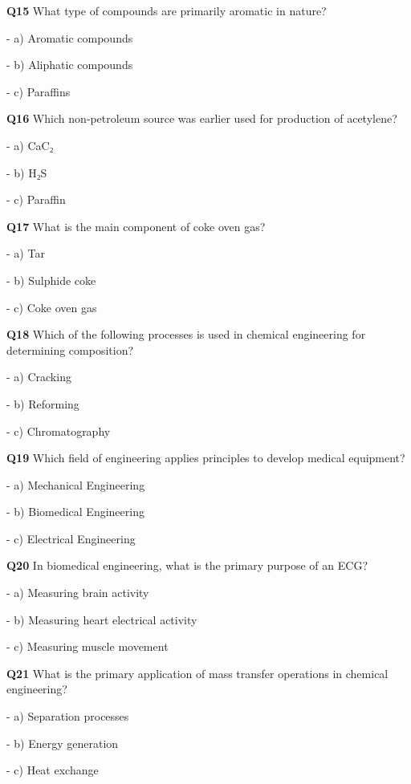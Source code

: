\textbf{Q15} What type of compounds are primarily aromatic in nature?\par
\quad - a) Aromatic compounds\par
\quad - b) Aliphatic compounds\par
\quad - c) Paraffins\par

\textbf{Q16} Which non‑petroleum source was earlier used for production of acetylene?\par
\quad - a) CaC₂\par
\quad - b) H₂S\par
\quad - c) Paraffin\par

\textbf{Q17} What is the main component of coke oven gas?\par
\quad - a) Tar\par
\quad - b) Sulphide coke\par
\quad - c) Coke oven gas\par

\textbf{Q18} Which of the following processes is used in chemical engineering for determining composition?\par
\quad - a) Cracking\par
\quad - b) Reforming\par
\quad - c) Chromatography\par

\textbf{Q19} Which field of engineering applies principles to develop medical equipment?\par
\quad - a) Mechanical Engineering\par
\quad - b) Biomedical Engineering\par
\quad - c) Electrical Engineering\par

\textbf{Q20} In biomedical engineering, what is the primary purpose of an ECG?\par
\quad - a) Measuring brain activity\par
\quad - b) Measuring heart electrical activity\par
\quad - c) Measuring muscle movement\par

\textbf{Q21} What is the primary application of mass transfer operations in chemical engineering?\par
\quad - a) Separation processes\par
\quad - b) Energy generation\par
\quad - c) Heat exchange\par


